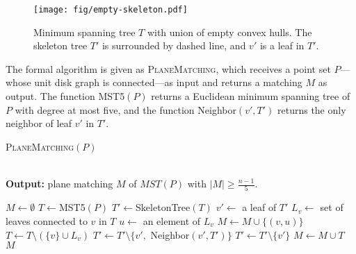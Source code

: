 \documentclass[11pt,a4paper]{article}
\newcommand{\ensure}{\textbf{Output: }}
\begin{document}
\begin{figure}[ht]
  \centering
    \texttt{[image: fig/empty-skeleton.pdf]}
  \caption{Minimum spanning tree $T$ with union of empty convex hulls. The skeleton tree $T'$ is surrounded by dashed line, and $v'$ is a leaf in $T'$. }
\label{empty-skeleton-fig}
\end{figure}

The formal algorithm is given as {\scshape PlaneMatching}, which receives a point set $P$---whose unit disk graph is connected---as input and returns a matching $M$ as output. The function MST5$(P)$ returns a Euclidean minimum spanning tree of $P$ with degree at most five, and the function Neighbor$(v', T')$ returns the only neighbor of leaf $v'$ in $T'$.

\begin{algorithm}                      \caption{{\scshape PlaneMatching}$(P)$}          \label{alg1} 
\\
\ensure{plane matching $M$ of $MST(P)$ with $|M|\ge\frac{n-1}{5}$.}
\begin{algorithmic}[1]
    \State $M \gets \emptyset$
    \State $T \gets $MST5$(P)$
    \State $T' \gets $SkeletonTree$(T)$
	\State $v' \gets$ {a leaf of } $T'$
	\State $L_v \gets$ {set of leaves  connected to } $v$ { in } $T$
        \State $u \gets$ {an element of } $L_v$
	\State $M \gets M\cup\{(v,u)\}$	
	\State $T\gets T\setminus (\{v\}\cup L_v)$
	    \State $T'\gets T'\setminus \{v',${ Neighbor}$(v', T')\}$
	\Else
	    \State $T'\gets T'\setminus \{v'\}$
	\EndIf
    \EndWhile
	\State $M \gets M\cup T$
    \EndIf
    \State \Return $M$
\end{algorithmic}
\end{algorithm}
\end{document}
